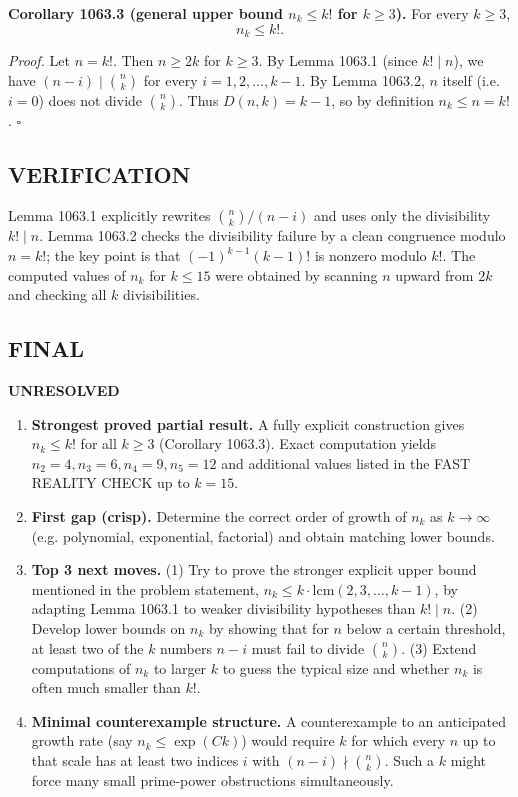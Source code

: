 \medskip
\textbf{Corollary 1063.3 (general upper bound $n_k\le k!$ for $k\ge 3$).}
For every $k\ge 3$,
\[
 n_k \le k!.
\]

\emph{Proof.}
Let $n=k!$. Then $n\ge 2k$ for $k\ge 3$.
By Lemma 1063.1 (since $k!\mid n$), we have $(n-i)\mid \binom{n}{k}$ for every $i=1,2,\dots,k-1$.
By Lemma 1063.2, $n$ itself (i.e. $i=0$) does not divide $\binom{n}{k}$.
Thus $D(n,k)=k-1$, so by definition $n_k\le n=k!$. \hfill$\square$

\subsection*{VERIFICATION}
Lemma 1063.1 explicitly rewrites $\binom{n}{k}/(n-i)$ and uses only the divisibility $k!\mid n$.
Lemma 1063.2 checks the divisibility failure by a clean congruence modulo $n=k!$; the key point is that $(-1)^{k-1}(k-1)!$ is nonzero modulo $k!$.
The computed values of $n_k$ for $k\le 15$ were obtained by scanning $n$ upward from $2k$ and checking all $k$ divisibilities.

\subsection*{FINAL}
\textbf{UNRESOLVED}
\begin{enumerate}
\item[(i)] \textbf{Strongest proved partial result.}
A fully explicit construction gives $n_k\le k!$ for all $k\ge 3$ (Corollary 1063.3). Exact computation yields $n_2=4,n_3=6,n_4=9,n_5=12$ and additional values listed in the FAST REALITY CHECK up to $k=15$.
\item[(ii)] \textbf{First gap (crisp).}
Determine the correct order of growth of $n_k$ as $k\to\infty$ (e.g. polynomial, exponential, factorial) and obtain matching lower bounds.
\item[(iii)] \textbf{Top 3 next moves.}
(1) Try to prove the stronger explicit upper bound mentioned in the problem statement, $n_k\le k\cdot \mathrm{lcm}(2,3,\dots,k-1)$, by adapting Lemma 1063.1 to weaker divisibility hypotheses than $k!\mid n$.
(2) Develop lower bounds on $n_k$ by showing that for $n$ below a certain threshold, at least two of the $k$ numbers $n-i$ must fail to divide $\binom{n}{k}$.
(3) Extend computations of $n_k$ to larger $k$ to guess the typical size and whether $n_k$ is often much smaller than $k!$.
\item[(iv)] \textbf{Minimal counterexample structure.}
A counterexample to an anticipated growth rate (say $n_k\le \exp(Ck)$) would require $k$ for which every $n$ up to that scale has at least two indices $i$ with $(n-i)\nmid \binom{n}{k}$. Such a $k$ might force many small prime-power obstructions simultaneously.
\end{enumerate}


